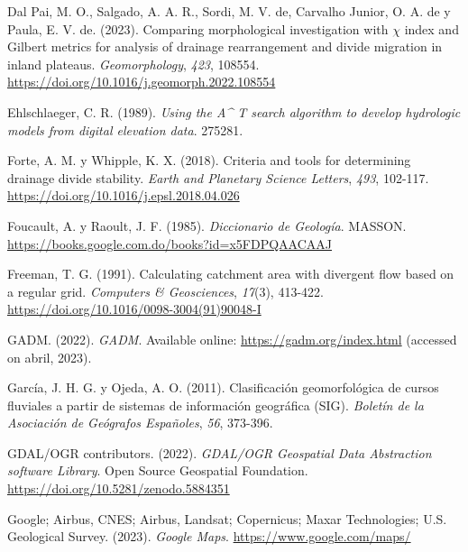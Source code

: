 \documentclass[spanish]{article}
\newlength{\cslhangindent}
\newlength{\cslentryspacingunit} %
\newenvironment{CSLReferences}[2] %
 {%
  \setlength{\parindent}{0pt}
  \ifodd #1
  \let\oldpar\par
  \def\par{\hangindent=\cslhangindent\oldpar}
  \fi
  \setlength{\parskip}{#2\cslentryspacingunit}
 }%
 {}
\begin{document}
\begin{CSLReferences}{1}{0}
\leavevmode{}%
Dal Pai, M. O., Salgado, A. A. R., Sordi, M. V. de, Carvalho Junior, O.
A. de y Paula, E. V. de. (2023). {Comparing morphological investigation
with \(\chi\) index and Gilbert metrics for analysis of drainage
rearrangement and divide migration in inland plateaus}.
\emph{Geomorphology}, \emph{423}, 108554.
\url{https://doi.org/10.1016/j.geomorph.2022.108554}

\leavevmode{}%
Ehlschlaeger, C. R. (1989). \emph{Using the A{\^{}} T search algorithm
to develop hydrologic models from digital elevation data}. 275281.

\leavevmode{}%
Forte, A. M. y Whipple, K. X. (2018). Criteria and tools for determining
drainage divide stability. \emph{Earth and Planetary Science Letters},
\emph{493}, 102-117. \url{https://doi.org/10.1016/j.epsl.2018.04.026}

\leavevmode{}%
Foucault, A. y Raoult, J. F. (1985). \emph{Diccionario de Geología}.
MASSON. \url{https://books.google.com.do/books?id=x5FDPQAACAAJ}

\leavevmode{}%
Freeman, T. G. (1991). Calculating catchment area with divergent flow
based on a regular grid. \emph{Computers \& Geosciences}, \emph{17}(3),
413-422. \url{https://doi.org/10.1016/0098-3004(91)90048-I}

\leavevmode{}%
GADM. (2022). \emph{{GADM}}. Available online:
\url{https://gadm.org/index.html} (accessed on abril, 2023).

\leavevmode{}%
García, J. H. G. y Ojeda, A. O. (2011). Clasificación geomorfológica de
cursos fluviales a partir de sistemas de información geográfica (SIG).
\emph{Boletín de la Asociación de Geógrafos Españoles}, \emph{56},
373-396.

\leavevmode{}%
GDAL/OGR contributors. (2022). \emph{{GDAL/OGR} Geospatial Data
Abstraction software Library}. Open Source Geospatial Foundation.
\url{https://doi.org/10.5281/zenodo.5884351}

\leavevmode{}%
Google; Airbus, CNES; Airbus, Landsat; Copernicus; Maxar Technologies;
U.S. Geological Survey. (2023). \emph{Google Maps}.
\url{https://www.google.com/maps/}


\end{CSLReferences}
\end{document}
